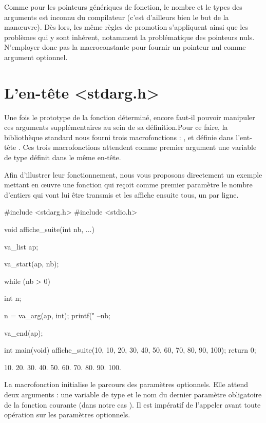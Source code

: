 \begin{attentionbox} 
 Comme pour les pointeurs génériques de
fonction, le nombre et le types des arguments est inconnu du compilateur
(c'est d'ailleurs bien le but de la manœuvre). Dès lors, les même règles
de promotion s'appliquent ainsi que les problèmes qui y sont inhérent,
notamment la problématique des pointeurs nuls. N'employer donc pas la
macroconstante  pour fournir un pointeur nul comme argument
optionnel.
\end{attentionbox}

\section{L'en-tête <stdarg.h> }
\label{len-tete-<stdarg.h>}

Une fois le prototype de la fonction déterminé, encore faut-il
pouvoir manipuler ces arguments supplémentaires au sein de sa
définition.Pour ce faire, la bibliothèque standard nous fourni trois
macrofonctions : ,  et
 définie dans l'ent-tête
. Ces trois macrofonctions
attendent comme premier argument une variable de type 
définit dans le même en-tête.

Afin d'illustrer leur fonctionnement, nous vous proposons directement un
exemple mettant en œuvre une fonction  qui
reçoit comme premier paramètre le nombre d'entiers qui vont lui être
transmis et les affiche ensuite tous, un par ligne.

\begin{C}
#include <stdarg.h>
#include <stdio.h>


void affiche_suite(int nb, ...)
{
    va_list ap;

    va_start(ap, nb);

    while (nb > 0)
    {
        int n;

        n = va_arg(ap, int);
        printf("%
        --nb;
    }

    va_end(ap);
}


int main(void)
{
    affiche_suite(10, 10, 20, 30, 40, 50, 60, 70, 80, 90, 100);
    return 0;
}
\end{C}

\begin{C}
10.
20.
30.
40.
50.
60.
70.
80.
90.
100.
\end{C}

La macrofonction  initialise le parcours des
paramètres optionnels. Elle attend deux arguments : une variable de type
 et le nom du dernier paramètre obligatoire de la
fonction courante (dans notre cas ). Il est impératif de
l'appeler avant toute opération sur les paramètres optionnels.

